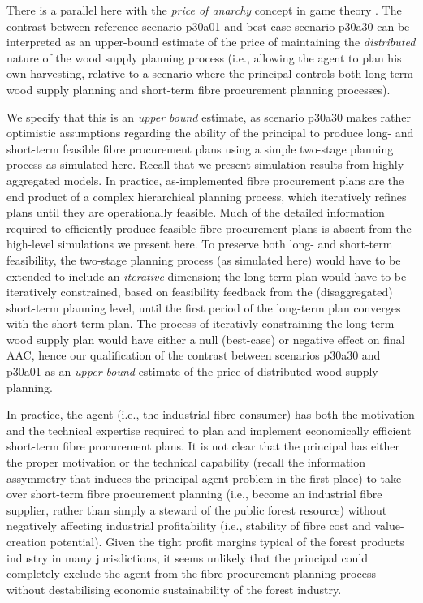 There is a parallel here with the \emph{price of anarchy} concept in game theory \citep{shoham2009multiagent, nisan2007algorithmic}. The contrast between reference scenario p30a01 and best-case scenario p30a30 can be interpreted as an upper-bound estimate of the price of maintaining the \emph{distributed} nature of the wood supply planning process (i.e., allowing the agent to plan his own harvesting, relative to a scenario where the principal controls both long-term wood supply planning and short-term fibre procurement planning processes). 

We specify that this is an \emph{upper bound} estimate, as scenario p30a30 makes rather optimistic assumptions regarding the ability of the principal to produce long- and short-term feasible fibre procurement plans using a simple two-stage planning process as simulated here. Recall that we present simulation results from highly aggregated models. In practice, as-implemented fibre procurement plans are the end product of a complex hierarchical planning process, which iteratively refines plans until they are operationally feasible. Much of the detailed information required to efficiently produce feasible fibre procurement plans is absent from the high-level simulations we present here. To preserve both long- and short-term feasibility, the two-stage planning process (as simulated here) would have to be extended to include an \emph{iterative} dimension; the long-term plan would have to be iteratively constrained, based on feasibility feedback from the (disaggregated) short-term planning level, until the first period of the long-term plan converges with the short-term plan. The process of iterativly constraining the long-term wood supply plan would have either a null (best-case) or negative effect on final AAC, hence our qualification of the contrast between scenarios p30a30 and p30a01 as an \emph{upper bound} estimate of the price of distributed wood supply planning.

In practice, the agent (i.e., the industrial fibre consumer) has both the motivation and the technical expertise required to plan and implement economically efficient short-term fibre procurement plans. It is not clear that the principal has either the proper motivation or the technical capability (recall the information assymmetry that induces the principal-agent problem in the first place) to take over short-term fibre procurement planning (i.e., become an industrial fibre supplier, rather than simply a steward of the public forest resource) without negatively affecting industrial profitability (i.e., stability of fibre cost and value-creation potential). Given the tight profit margins typical of the forest products industry in many jurisdictions, it seems unlikely that the principal could completely exclude the agent from the fibre procurement planning process without destabilising economic sustainability of the forest industry.

